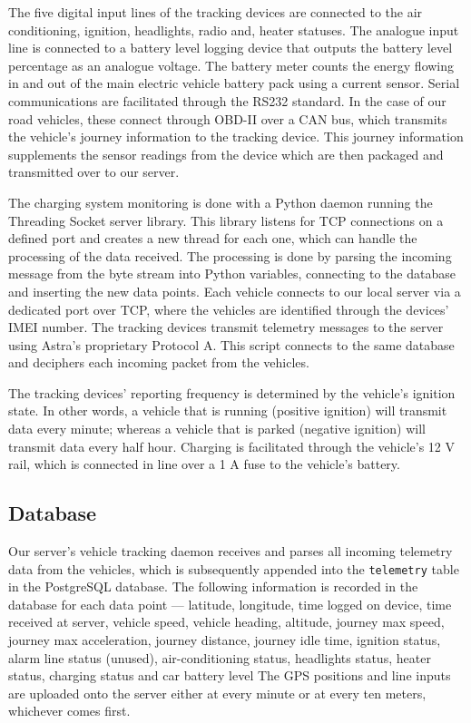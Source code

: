 
The five digital input lines of the tracking devices are connected to the air conditioning, ignition, headlights, radio and, heater statuses. The analogue input line is connected to a battery level logging device that outputs the battery level percentage as an analogue voltage. The battery meter counts the energy flowing in and out of the main electric vehicle battery pack using a current sensor. Serial communications are facilitated through the RS232 standard. In the case of our road vehicles, these connect through OBD-II over a CAN bus, which transmits the vehicle’s journey information to the tracking device. This journey information supplements the sensor readings from the device which are then packaged and transmitted over to our server.

The charging system monitoring is done with a Python daemon running the Threading Socket server library. This library listens for TCP connections on a defined port and creates a new thread for each one, which can handle the processing of the data received. The processing is done by parsing the incoming message from the byte stream into Python variables, connecting to the database and inserting the new data points. Each vehicle connects to our local server via a dedicated port over TCP, where the vehicles are identified through the devices’ IMEI number. The tracking devices transmit telemetry messages to the server using Astra’s proprietary Protocol A. This script connects to the same database and deciphers each incoming packet from the vehicles. 


The tracking devices’ reporting frequency is determined by the vehicle’s ignition state. In other words, a vehicle that is running (positive ignition) will transmit data every minute; whereas a vehicle that is parked (negative ignition) will transmit data every half hour. Charging is facilitated through the vehicle’s 12 V rail, which is connected in line over a 1 A fuse to the vehicle’s battery.

\subsection{Database}
\label{sec:9:vt:db}
Our server’s vehicle tracking daemon receives and parses all incoming telemetry data from the vehicles, which is subsequently appended into the \texttt{telemetry} table in the PostgreSQL database. The following information is recorded in the database for each data point --- latitude, longitude, time logged on device, time received at server, vehicle speed, vehicle heading, altitude, journey max speed, journey max acceleration, journey distance, journey idle time, ignition status, alarm line status (unused), air-conditioning status, headlights status, heater status, charging status and car battery level The GPS positions and line inputs are uploaded onto the server either at every minute or at every ten meters, whichever comes first.

